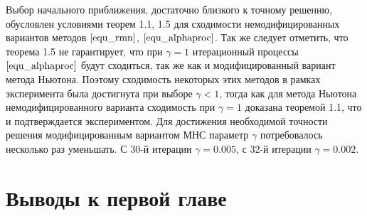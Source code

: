 Выбор начального приближения, достаточно близкого к точному решению, обусловлен условиями теорем 1.1, 1.5 для сходимости немодифицированных вариантов методов $\eqref{equ_rmn}$, $\eqref{equ_alphaproc}$. Так же следует отметить, что теорема 1.5 не гарантирует, что при $\gamma=1$ итерационный процессы $\eqref{equ_alphaproc}$ будут сходиться, так же как и модифицированный вариант метода Ньютона. Поэтому сходимость некоторых этих методов в рамках эксперимента была достигнута при выборе $\gamma<1$, тогда как для метода Ньютона немодифицированного варианта сходимость при $\gamma=1$ доказана теоремой 1.1, что и подтверждается экспериментом. Для достижения необходимой точности решения модифицированным вариантом МНС параметр $\gamma$ потребовалось несколько раз уменьшать. С 30-й итерации $\gamma=0.005$, с 32-й итерации $\gamma=0.002$.
\section{Выводы к первой главе}